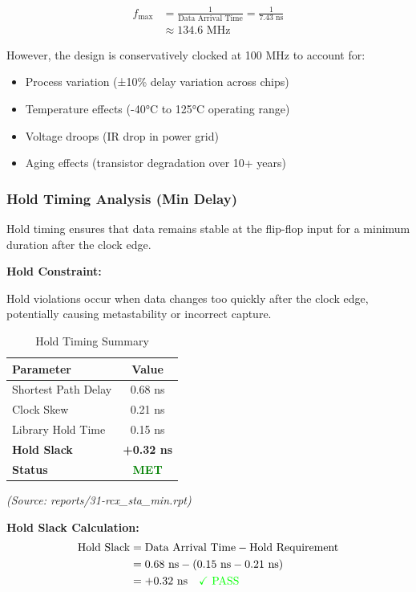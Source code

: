 \documentclass[12pt,a4paper]{article}
\begin{document}
\begin{align}
    f_{\text{max}} &= \frac{1}{\text{Data Arrival Time}} = \frac{1}{7.43 \text{ ns}} \nonumber \\
    &\approx 134.6 \text{ MHz}
\end{align}

However, the design is conservatively clocked at 100 MHz to account for:
\begin{itemize}
    \item Process variation (±10\% delay variation across chips)
    \item Temperature effects (-40°C to 125°C operating range)
    \item Voltage droops (IR drop in power grid)
    \item Aging effects (transistor degradation over 10+ years)
\end{itemize}

\newpage

\subsubsection{Hold Timing Analysis (Min Delay)}

Hold timing ensures that data remains stable at the flip-flop input for a minimum duration after the clock edge.

\textbf{Hold Constraint:}

Hold violations occur when data changes too quickly after the clock edge, potentially causing metastability or incorrect capture.

\begin{table}[H]
\centering
\caption{Hold Timing Summary}
\label{tab:hold_timing}
\begin{tabular}{@{}lc@{}}
\toprule
\textbf{Parameter} & \textbf{Value} \\
\midrule
Shortest Path Delay & 0.68 ns \\
Clock Skew & 0.21 ns \\
Library Hold Time & 0.15 ns \\
\midrule
\textbf{Hold Slack} & \textbf{+0.32 ns} \\
\textbf{Status} & \textcolor{green}{\textbf{MET}} \\
\bottomrule
\end{tabular}
\end{table}

\textit{(Source: reports/31-rcx\_sta\_min.rpt)}

\textbf{Hold Slack Calculation:}
\begin{align}
    \text{Hold Slack} &= \text{Data Arrival Time} - \text{Hold Requirement} \nonumber \\
    &= 0.68 \text{ ns} - (0.15 \text{ ns} - 0.21 \text{ ns}) \nonumber \\
    &= +0.32 \text{ ns} \quad \textcolor{green}{\checkmark \text{ PASS}}
\end{align}
\end{document}
